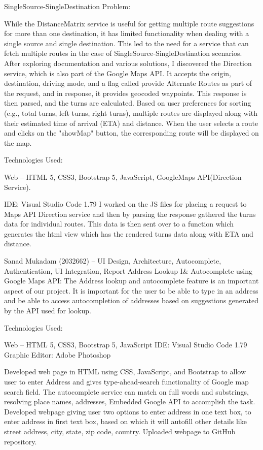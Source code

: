 \documentclass{article}
\begin{document}
SingleSource-SingleDestination Problem:

While the DistanceMatrix service is useful for getting multiple route suggestions for more than one destination, it has limited functionality when dealing with a single source and single destination. This led to the need for a service that can fetch multiple routes in the case of SingleSource-SingleDestination scenarios. After exploring documentation and various solutions, I discovered the Direction service, which is also part of the Google Maps API. It accepts the origin, destination, driving mode, and a flag called provide Alternate Routes as part of the request, and in response, it provides geocoded waypoints. This response is then parsed, and the turns are calculated. Based on user preferences for sorting (e.g., total turns, left turns, right turns), multiple routes are displayed along with their estimated time of arrival (ETA) and distance. When the user selects a route and clicks on the "showMap" button, the corresponding route will be displayed on the map.

Technologies Used: 

	Web – HTML 5, CSS3, Bootstrap 5, JavaScript, GoogleMaps API(Direction Service).

	IDE: Visual Studio Code 1.79 
I worked on the JS files for placing a request to Maps API Direction service and then by parsing the response gathered the turns data for individual routes. This data is then sent over to a function which generates the html view which has the rendered turns data along with ETA and distance.

Sanad Mukadam (2032662) – UI Design, Architecture, Autocomplete, Authentication, UI Integration, Report Address Lookup I\& Autocomplete using Google Maps API: 
The Address lookup and autocomplete feature is an important aspect of our project. It is important for the user to be able to type in an address and be able to access autocompletion of addresses based on suggestions generated by the API used for lookup.

Technologies Used: 

	Web – HTML 5, CSS3, Bootstrap 5, JavaScript
	IDE: Visual Studio Code 1.79 
	Graphic Editor: Adobe Photoshop 
 
	Developed web page in HTML using CSS, JavaScript, and Bootstrap to allow user to enter Address and gives type-ahead-search functionality of Google map search field. The autocomplete service can match on full words and substrings, resolving place names, addresses,
	Embedded Google API to accomplish the task. 
	Developed webpage giving user two options  
	to enter address in one text box, 
	to enter address in first text box, based on which it will autofill other details like street address, city, state, zip code, country.  
	Uploaded webpage to GitHub repository. 
\end{document}
